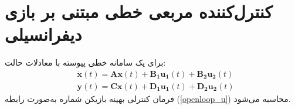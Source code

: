 

\section{کنترل‌کننده مربعی خطی مبتنی بر بازی دیفرانسیلی}\label{LQDG}
برای یک سامانه خطی پیوسته با معادلات حالت:
 \begin{equation}\label{systemlqdg}
 	\begin{split}
		&\boldsymbol{\dot x}(t) = \boldsymbol{Ax}(t) + \boldsymbol{B_1u_1}(t) + \boldsymbol{B_2u_2}(t)%
		\\
		&\boldsymbol{y}(t) = \boldsymbol{Cx}(t) + \boldsymbol{D_1u_1}(t) + \boldsymbol{D_2u_2}(t)
	\end{split}
\end{equation}
فرمان کنترلی بهینه  بازیکن شماره  به‌صورت رابطه
(\ref{openloop_u})
محاسبه می‌شود.

